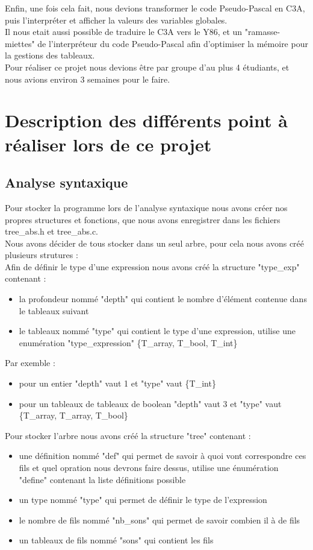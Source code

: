 \documentclass{report}
\begin{document}
Enfin, une fois cela fait, nous devions transformer le code Pseudo-Pascal en C3A, puis l'interpréter et afficher la valeurs des variables globales.\\

Il nous etait aussi possible de traduire le C3A vers le Y86, et un "ramasse-miettes" de l'interpréteur du code Pseudo-Pascal afin d'optimiser la mémoire pour la gestions des tableaux.\\

Pour réaliser ce projet nous devions être par groupe d'au plus 4 étudiants, et nous avions environ 3 semaines pour le faire.

\newpage

\section{Description des différents point à réaliser lors de ce projet}
\subsection{Analyse syntaxique}
Pour stocker la programme lors de l'analyse syntaxique nous avons créer nos propres structures et fonctions, que nous avons enregistrer dans les fichiers tree\_abs.h et tree\_abs.c.\\

Nous avons décider de tous stocker dans un seul arbre, pour cela nous avons créé plusieurs strutures :\\

Afin de définir le type d'une expression nous avons créé la structure "type\_exp" contenant :
\begin{itemize}
\item la profondeur nommé "depth" qui contient le nombre d'élément contenue dans le tableaux suivant
\item le tableaux nommé "type" qui contient le type d'une expression, utilise une enumération "type\_expression" \{T\_array, T\_bool, T\_int\}
\end{itemize}
Par exemble :
\begin{itemize}
\item pour un entier "depth" vaut 1 et "type" vaut \{T\_int\}
\item pour un tableaux de tableaux de boolean "depth" vaut 3 et "type" vaut \{T\_array, T\_array, T\_bool\}
\end{itemize}
\bigskip

Pour stocker l'arbre nous avons créé la structure "tree" contenant :
\begin{itemize}
\item une définition nommé "def" qui permet de savoir à quoi vont correspondre ces fils et quel opration nous devrons faire dessus, utilise une énumération "define" contenant la liste définitions possible
\item un type nommé "type" qui permet de définir le type de l'expression
\item le nombre de fils nommé "nb\_sons" qui permet de savoir combien il à de fils
\item un tableaux de fils nommé "sons" qui contient les fils
\end{itemize}
\bigskip
\end{document}
